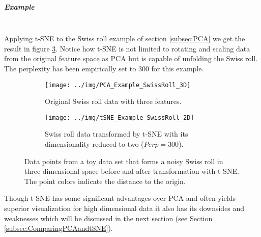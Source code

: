 \subparagraph{Example}\mbox{}\\
Applying t-SNE to the Swiss roll example of section \ref{subsec:PCA} we get the result in figure \ref{fig:tSNE_Example_SwissRoll_2D}. Notice how t-SNE is not limited to rotating and scaling data from the original feature space as PCA but is capable of unfolding the Swiss roll. The perplexity has been empirically set to 300 for this example.
\begin{figure}[H]
\begin{subfigure}{0.45\textwidth}
\texttt{[image: ../img/PCA\_Example\_SwissRoll\_3D]}
\caption{Original Swiss roll data with three features.}\label{fig:tSNE_Example_SwissRoll_3D}
\end{subfigure}
\begin{subfigure}{0.45\textwidth}
\texttt{[image: ../img/tSNE\_Example\_SwissRoll\_2D]}
\caption{Swiss roll data transformed by t-SNE with its dimensionality reduced to two ($Perp=300$).}\label{fig:tSNE_Example_SwissRoll_2D}
\end{subfigure}
\caption{Data points from a toy data set that forms a noisy Swiss roll in three dimensional space before and after transformation with t-SNE. The point colors indicate the distance to the origin.}
\end{figure}
\noindent Though t-SNE has some significant advantages over PCA and often yields superior visualization for high dimensional data it also has its downsides and weaknesses which will be discussed in the next section (see Section \ref{subsec:ComparingPCAandtSNE}).

